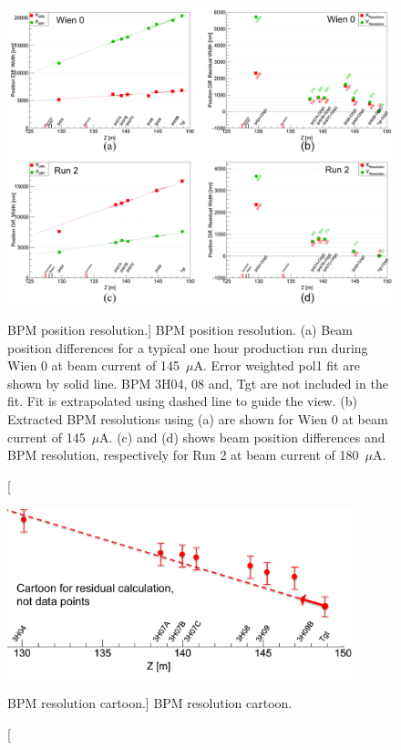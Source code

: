 \begin{singlespace}
\begin{figure}[!h]
	\begin{center}
	\includegraphics[width=15.0cm]{figures/bpmPositionResolution}
	\end{center}
	\caption
	[BPM position resolution.]
	{BPM position resolution. (a) Beam position differences for a typical one hour production run during Wien 0 at beam current of 145~$\mu$A. Error weighted pol1 fit are shown by solid line. BPM 3H04, 08 and, Tgt are not included in the fit. Fit is extrapolated using dashed line to guide the view. (b) Extracted BPM resolutions using (a) are shown for Wien 0 at beam current of 145~$\mu$A. (c) and (d) shows beam position differences and BPM resolution, respectively for Run 2 at beam current of 180~$\mu$A.}
	\label{fig:bpmPositionResolution}
\end{figure}
\end{singlespace}

\begin{singlespace}
\begin{figure}[!h]
	\begin{center}
	\includegraphics[width=10.0cm]{figures/bpmPositionResolutionCartoon}
	\end{center}
	\caption
	[BPM resolution cartoon.]
	{BPM resolution cartoon.}
	\label{fig:bpmPositionResolutionCartoon}
\end{figure}
\end{singlespace}

